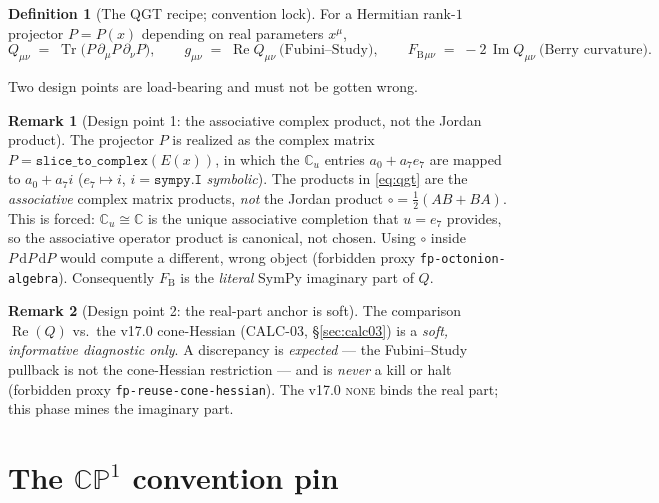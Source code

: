 \documentclass[11pt]{article}
\newcommand{\Tr}{\operatorname{Tr}}
\renewcommand{\Re}{\operatorname{Re}}
\renewcommand{\Im}{\operatorname{Im}}
\newcommand{\dd}{\mathrm{d}}
\newcommand{\Cu}{\mathbb{C}_u}
\newcommand{\FB}{F_{\mathrm{B}}}
\theoremstyle{plain}
\theoremstyle{definition}
\newtheorem{definition}{Definition}
\newtheorem{remark}{Remark}
\begin{document}
\begin{definition}[The QGT recipe; convention lock]
\label{def:qgt}
For a Hermitian rank-$1$ projector $P=P(x)$ depending on real parameters $x^\mu$,
\begin{equation}
  Q_{\mu\nu} \;=\; \Tr\!\big(P\,\partial_\mu P\,\partial_\nu P\big),
  \qquad
  g_{\mu\nu} \;=\; \Re Q_{\mu\nu}\ \text{(Fubini--Study)},
  \qquad
  \FB{}_{\mu\nu} \;=\; -2\,\Im Q_{\mu\nu}\ \text{(Berry curvature)} .
  \label{eq:qgt}
\end{equation}
\end{definition}

Two design points are load-bearing and must not be gotten wrong.

\begin{remark}[Design point 1: the associative complex product, not the Jordan product]
\label{rem:assoc}
The projector $P$ is realized as the complex matrix $P=\texttt{slice\_to\_complex}(E(x))$,
in which the $\Cu$ entries $a_0+a_7 e_7$ are mapped to $a_0+a_7 i$ ($e_7\mapsto i$,
$i=\texttt{sympy.I}$ \emph{symbolic}). The products in \eqref{eq:qgt} are the
\emph{associative} complex matrix products, \emph{not} the Jordan product
$\circ=\tfrac12(AB+BA)$. This is forced: $\Cu\cong\mathbb{C}$ is the unique associative
completion that $u=e_7$ provides, so the associative operator product is canonical,
not chosen. Using $\circ$ inside $P\,\dd P\,\dd P$ would compute a different, wrong
object (forbidden proxy \texttt{fp-octonion-algebra}). Consequently $\FB$ is the
\emph{literal} SymPy imaginary part of $Q$.
\end{remark}

\begin{remark}[Design point 2: the real-part anchor is soft]
\label{rem:soft}
The comparison $\Re(Q)$ vs.\ the v17.0 cone-Hessian (CALC-03,
\S\ref{sec:calc03}) is a \emph{soft, informative diagnostic only}. A discrepancy is
\emph{expected} --- the Fubini--Study pullback is not the cone-Hessian restriction
--- and is \emph{never} a kill or halt (forbidden proxy
\texttt{fp-reuse-cone-hessian}). The v17.0 \textsc{none} binds the real part; this
phase mines the imaginary part.
\end{remark}

\section{The $\mathbb{CP}^1$ convention pin}
\label{sec:cp1}
\end{document}

